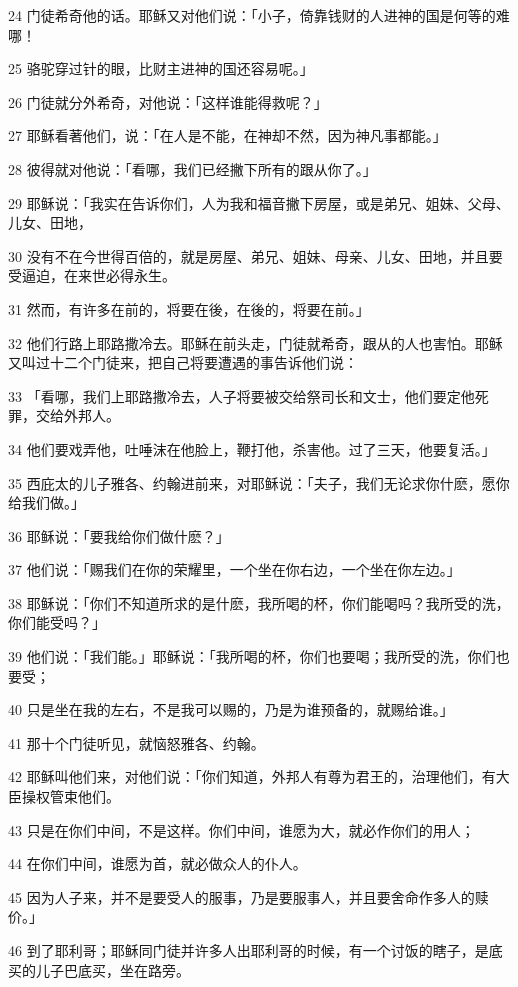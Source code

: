 \par 24 门徒希奇他的话。耶稣又对他们说：「小子，倚靠钱财的人进神的国是何等的难哪！
\par 25 骆驼穿过针的眼，比财主进神的国还容易呢。」
\par 26 门徒就分外希奇，对他说：「这样谁能得救呢？」
\par 27 耶稣看著他们，说：「在人是不能，在神却不然，因为神凡事都能。」
\par 28 彼得就对他说：「看哪，我们已经撇下所有的跟从你了。」
\par 29 耶稣说：「我实在告诉你们，人为我和福音撇下房屋，或是弟兄、姐妹、父母、儿女、田地，
\par 30 没有不在今世得百倍的，就是房屋、弟兄、姐妹、母亲、儿女、田地，并且要受逼迫，在来世必得永生。
\par 31 然而，有许多在前的，将要在後，在後的，将要在前。」
\par 32 他们行路上耶路撒冷去。耶稣在前头走，门徒就希奇，跟从的人也害怕。耶稣又叫过十二个门徒来，把自己将要遭遇的事告诉他们说：
\par 33 「看哪，我们上耶路撒冷去，人子将要被交给祭司长和文士，他们要定他死罪，交给外邦人。
\par 34 他们要戏弄他，吐唾沫在他脸上，鞭打他，杀害他。过了三天，他要复活。」
\par 35 西庇太的儿子雅各、约翰进前来，对耶稣说：「夫子，我们无论求你什麽，愿你给我们做。」
\par 36 耶稣说：「要我给你们做什麽？」
\par 37 他们说：「赐我们在你的荣耀里，一个坐在你右边，一个坐在你左边。」
\par 38 耶稣说：「你们不知道所求的是什麽，我所喝的杯，你们能喝吗？我所受的洗，你们能受吗？」
\par 39 他们说：「我们能。」耶稣说：「我所喝的杯，你们也要喝；我所受的洗，你们也要受；
\par 40 只是坐在我的左右，不是我可以赐的，乃是为谁预备的，就赐给谁。」
\par 41 那十个门徒听见，就恼怒雅各、约翰。
\par 42 耶稣叫他们来，对他们说：「你们知道，外邦人有尊为君王的，治理他们，有大臣操权管束他们。
\par 43 只是在你们中间，不是这样。你们中间，谁愿为大，就必作你们的用人；
\par 44 在你们中间，谁愿为首，就必做众人的仆人。
\par 45 因为人子来，并不是要受人的服事，乃是要服事人，并且要舍命作多人的赎价。」
\par 46 到了耶利哥；耶稣同门徒并许多人出耶利哥的时候，有一个讨饭的瞎子，是底买的儿子巴底买，坐在路旁。
